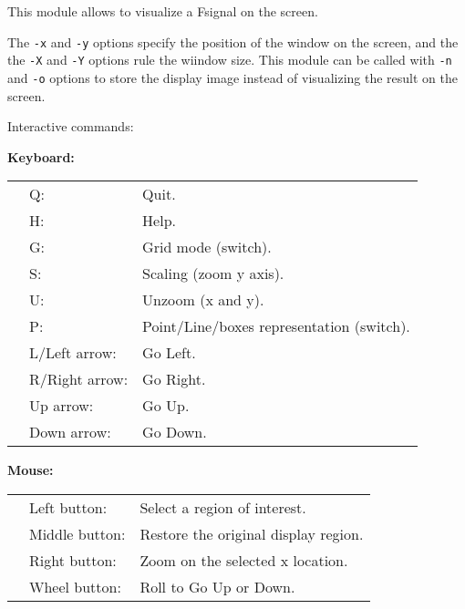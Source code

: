 This module allows to visualize a Fsignal on the screen.

\medskip

The \verb+-x+ and \verb+-y+ options specify the position of the
window on the screen, and the the \verb+-X+ and \verb+-Y+ options 
rule the wiindow size. This module can be called with \verb+-n+
and \verb+-o+ options to store the display image instead of
visualizing the result on the screen.

\bigskip

Interactive commands:

\bigskip

{\bf Keyboard:}
\begin{tabular}{lll}
&  Q:  &Quit.\\
&  H:  &Help.\\
&  G:  &Grid mode (switch).\\
&  S:  &Scaling (zoom y axis).\\
&  U:  &Unzoom (x and y).\\
&  P:  &Point/Line/boxes representation (switch).\\
&  L/Left arrow:   &Go Left.\\
&  R/Right arrow:  &Go Right.\\
&  Up arrow:       &Go Up.\\
&  Down arrow:     &Go Down.\\
\end{tabular}

\bigskip

{\bf Mouse:}
\begin{tabular}{lll}
&  Left button:    & Select a region of interest. \\
&  Middle button:  & Restore the original display region.\\
&  Right button:   & Zoom on the selected x location.\\
&  Wheel button:   & Roll to Go Up or Down.
\end{tabular}


